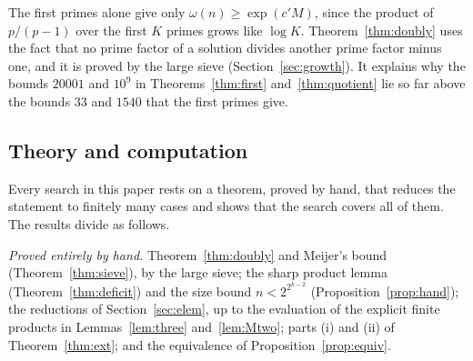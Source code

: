 \documentclass[11pt,reqno]{amsart}
\numberwithin{equation}{section}
\theoremstyle{plain}
\theoremstyle{definition}
\theoremstyle{remark}
\begin{document}
The first primes alone give only $\omega(n)\ge\exp(c'M)$, since the
product of $p/(p-1)$ over the first $K$ primes grows like $\log K$.
Theorem~\ref{thm:doubly} uses the fact that no prime factor of a
solution divides another prime factor minus one, and it is proved by
the large sieve (Section~\ref{sec:growth}). It explains why the bounds
$20001$ and $10^9$ in Theorems~\ref{thm:first} and~\ref{thm:quotient}
lie so far above the bounds $33$ and $1540$ that the first primes give.

\subsection{Theory and computation}
Every search in this paper rests on a theorem, proved by hand, that
reduces the statement to finitely many cases and shows that the search
covers all of them. The results divide as follows.

\emph{Proved entirely by hand.} Theorem~\ref{thm:doubly} and Meijer's
bound (Theorem~\ref{thm:sieve}), by the large sieve; the sharp product lemma
(Theorem~\ref{thm:deficit}) and the size bound $n<2^{2^{k-2}}$
(Proposition~\ref{prop:hand}); the reductions of
Section~\ref{sec:elem}, up to the evaluation of the explicit finite
products in Lemmas~\ref{lem:three} and~\ref{lem:Mtwo}; parts (i) and
(ii) of Theorem~\ref{thm:ext}; and the equivalence of
Proposition~\ref{prop:equiv}.
\end{document}

